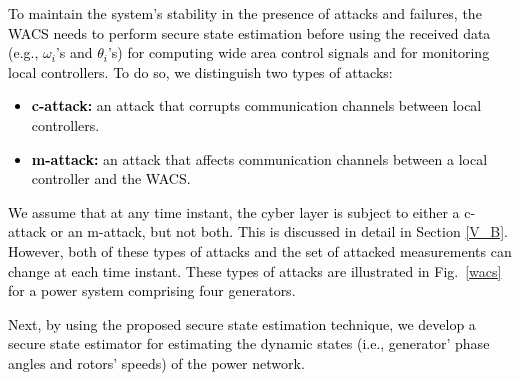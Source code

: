 \textcolor{black}{To maintain the system's stability in the presence of attacks and failures, the WACS needs to perform secure state estimation before using the received data (e.g., $\omega_i$'s and $\theta_i$'s) for computing wide area control signals and for monitoring local controllers. To do so, we distinguish two types of attacks:
\begin{itemize}
\item \textbf{c-attack:} an attack that corrupts communication channels between local controllers.
\item \textbf{m-attack:} an attack that affects communication channels between a local controller and the WACS. %
\end{itemize}
We assume that at any time instant, the cyber layer is subject to either a c-attack or an m-attack, but not both. This is discussed in detail in Section \ref{V_B}. However, both of these types of attacks and the set of attacked measurements can change at each time instant. These types of attacks are illustrated in Fig.~\ref{wacs} for a power system comprising four generators.}



\textcolor{black}{Next, by using the proposed secure state estimation technique, we develop a secure state estimator for estimating the dynamic states (i.e., generator' phase angles and rotors' speeds) of the power network.}


